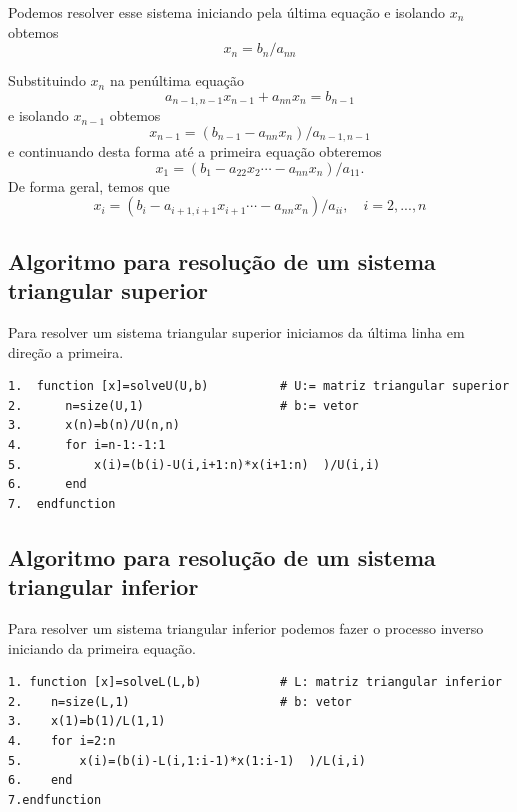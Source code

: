 Podemos resolver esse sistema iniciando pela última equação e isolando $x_n$ obtemos
\begin{equation}
 x_n = b_n/a_{nn}
\end{equation}

Substituindo $x_n$ na penúltima equação
\begin{equation}
 a_{n-1,n-1}x_{n-1}+a_{nn}x_n = b_{n-1}
\end{equation}
e isolando $x_{n-1}$ obtemos
\begin{equation}
 x_{n-1} = (b_{n-1}-a_{nn}x_n)/a_{n-1,n-1}
\end{equation}
e continuando desta forma até a primeira equação obteremos
\begin{equation}
 x_{1} = (b_{1}-a_{22}x_2 \cdots -a_{nn}x_n)/a_{11}.
\end{equation}
De forma geral, temos que
\begin{equation}
 x_{i} = (b_{i}-a_{i+1,i+1}x_{i+1} \cdots -a_{nn}x_n)/a_{ii}, \quad i=2,...,n
\end{equation}



\subsection{Algoritmo para resolução de um sistema triangular superior}

Para resolver um sistema triangular superior iniciamos da última linha em direção a primeira.

\begin{verbatim}
1.  function [x]=solveU(U,b)          # U:= matriz triangular superior
2.      n=size(U,1)                   # b:= vetor
3.      x(n)=b(n)/U(n,n)
4.      for i=n-1:-1:1
5.          x(i)=(b(i)-U(i,i+1:n)*x(i+1:n)  )/U(i,i)
6.      end
7.  endfunction

\end{verbatim}

\subsection{Algoritmo para resolução de um sistema triangular inferior}
Para resolver um sistema triangular inferior podemos fazer o processo inverso iniciando da primeira equação.

\begin{verbatim}
1. function [x]=solveL(L,b)           # L: matriz triangular inferior
2.    n=size(L,1)                     # b: vetor
3.    x(1)=b(1)/L(1,1)
4.    for i=2:n
5.        x(i)=(b(i)-L(i,1:i-1)*x(1:i-1)  )/L(i,i)
6.    end
7.endfunction
\end{verbatim}


